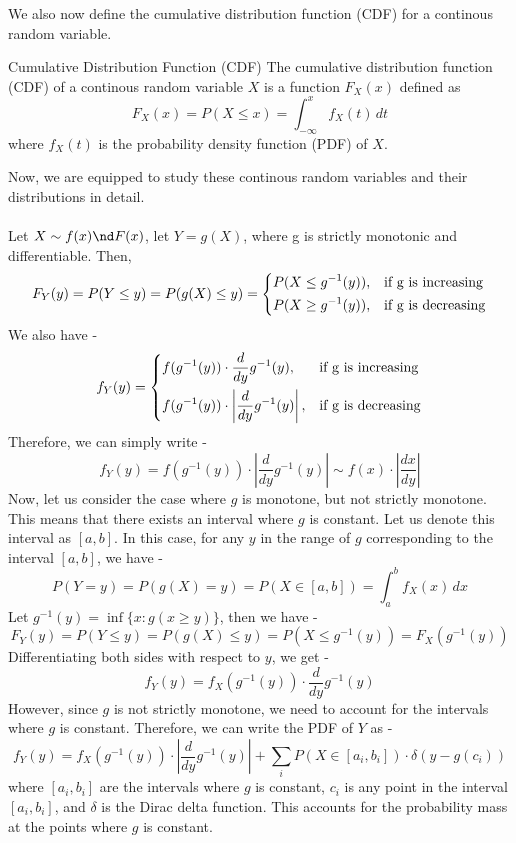 \documentclass[openany]{book}
\begin{document}
We also now define the cumulative distribution function (CDF) for a continous random variable.
\begin{mydefinition}{Cumulative Distribution Function (CDF)}
    The cumulative distribution function (CDF) of a continous random variable \( X \) is a function \( F_X(x) \) defined as
    \[
        F_X(x) = P(X \leq x) = \int_{-\infty}^{x} f_X(t) \, dt
    \]
    where \( f_X(t) \) is the probability density function (PDF) of \( X \).
\end{mydefinition}
Now, we are equipped to study these continous random variables and their distributions in detail. \\\\
Let $X \sim f(x) \nd F(x)$, let $Y = g(X)$, where g is strictly monotonic and differentiable. Then, 
$$F_Y(y) = P(Y \leq y) = P(g(X) \leq y) = \begin{dcases}
    P(X \leq g^{-1}(y)), & \text{if g is increasing} \\
    P(X \geq g^{-1}(y)), & \text{if g is decreasing}
\end{dcases}$$
We also have - 
$$f_Y(y) = \begin{dcases}
    f(g^{-1}(y)) \cdot \frac{d}{dy} g^{-1}(y), & \text{if g is increasing} \\
    f(g^{-1}(y)) \cdot \left| \frac{d}{dy} g^{-1}(y) \right|, & \text{if g is decreasing}
\end{dcases}$$
Therefore, we can simply write - 
$$f_Y(y) = f(g^{-1}(y)) \cdot \left| \frac{d}{dy} g^{-1}(y) \right| \sim f(x) \cdot |\frac{dx}{dy}|$$
Now, let us consider the case where $g$ is monotone, but not strictly monotone. This means that there exists an interval where $g$ is constant. Let us denote this interval as $[a, b]$. In this case, for any $y$ in the range of $g$ corresponding to the interval $[a, b]$, we have -
$$P(Y = y) = P(g(X) = y) = P(X \in [a, b]) = \int_{a}^{b} f_X(x) \, dx$$
Let $g^{-1}(y) = \inf \{x: g(x \geq y) \}$, then we have -
$$F_Y(y) = P(Y \leq y) = P(g(X) \leq y) = P(X \leq g^{-1}(y)) = F_X(g^{-1}(y))$$
Differentiating both sides with respect to $y$, we get -
$$f_Y(y) = f_X(g^{-1}(y)) \cdot \frac{d}{dy} g^{-1}(y)$$
However, since $g$ is not strictly monotone, we need to account for the intervals
where $g$ is constant. Therefore, we can write the PDF of $Y$ as -
$$f_Y(y) = f_X(g^{-1}(y)) \cdot \left| \frac{d}{dy} g^{-1}(y) \right| + \sum_{i} P(X \in [a_i, b_i]) \cdot \delta(y - g(c_i))$$
where $[a_i, b_i]$ are the intervals where $g$ is constant, $c_i$ is any point in the interval $[a_i, b_i]$, and $\delta$ is the Dirac delta function. This accounts for the probability mass at the points where $g$ is constant. \\\\
\end{document}
